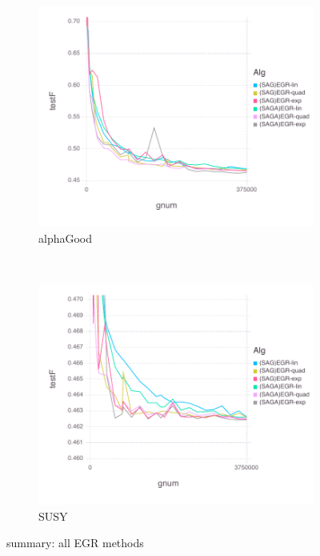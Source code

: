 \documentclass[11pt]{article}
\begin{document}
\begin{figure}[H]
       \begin{subfigure}[b]{0.45\textwidth}
           \includegraphics[width=\textwidth]{Figures/alphaGoodBLtrueFfFinal-1.pdf}
           \caption{alphaGood}
       \end{subfigure}
       ~ %
         \begin{subfigure}[b]{0.45\textwidth}
           \includegraphics[width=\textwidth]{Figures/SUSYBLtrueFfFinal-1.pdf}
             \caption{SUSY}
         \end{subfigure}
       \caption{summary: all EGR methods}\label{fig:alphaGoodsummary}
   \end{figure}
   
\end{document}
